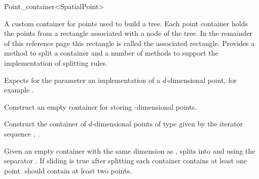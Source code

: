 

\begin{ccRefClass}{Point_container<SpatialPoint>}  %






\ccDefinition
A custom container for points used to build a tree. Each point container
holds the points from a rectangle associated with a node of the tree.
In the remainder of this reference page this rectangle is called the
associated rectangle.
Provides a method to split a container and a number of methods
to support the implementation of splitting rules.


\ccParameters

Expects for the parameter  an implementation of 
a $d$-dimensional point, for example .

\ccTypes


\ccCreation
{}

{
Construct an empty container for storing -dimensional points.
}

{
Construct the container of $d$-dimensional points of type 
given by the iterator sequence , .
}



\ccOperations

{Given an empty container  with the same dimension as , splits  into
 and  using the separator . If sliding is true after splitting 
each container contains at least one point.  should contain at least two points.}



\end{ccRefClass}
